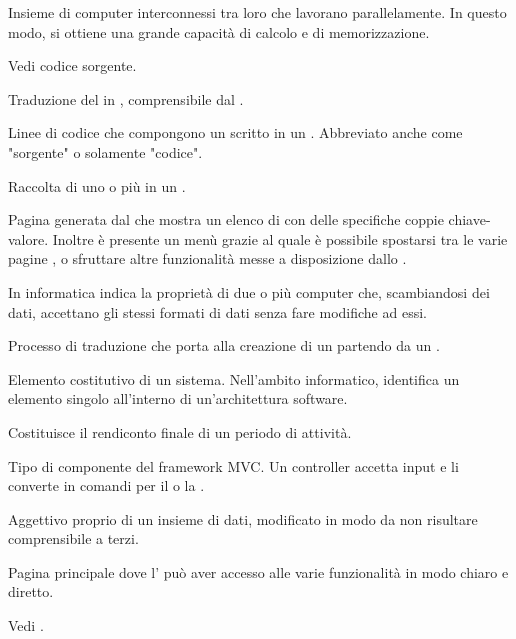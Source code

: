 {Insieme di computer interconnessi tra loro che lavorano parallelamente. In questo modo, si ottiene una grande capacità di calcolo e di memorizzazione.}

{Vedi codice sorgente.}

{Traduzione del  in , comprensibile dal .}

{Linee di codice che compongono un  scritto in un . Abbreviato anche come "sorgente" o solamente "codice".}

{Raccolta di uno o più  in un .}

{Pagina generata dal   che mostra un elenco di  con delle specifiche coppie chiave-valore. Inoltre è presente un menù grazie al quale è possibile spostarsi tra le varie pagine , o sfruttare altre funzionalità messe a disposizione dallo .}

{In informatica indica la proprietà di due o più computer che, scambiandosi dei dati, accettano gli stessi formati di dati senza fare modifiche ad essi.}

{Processo di traduzione che porta alla creazione di un  partendo da un .}

{Elemento costitutivo di un sistema. Nell'ambito informatico, identifica un elemento singolo all'interno di un'architettura software.}

{Costituisce il rendiconto finale di un periodo di attività.}

{Tipo di componente del framework MVC. Un controller accetta input e li converte in comandi per il  o la .} 
 
{Aggettivo proprio di un insieme di dati, modificato in modo da non risultare comprensibile a terzi.}




{Pagina principale dove l' può aver accesso alle varie funzionalità in modo chiaro e diretto.}

{Vedi .}

